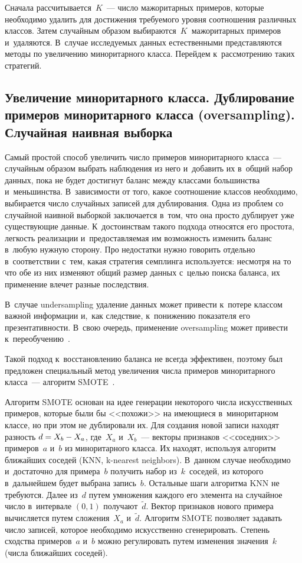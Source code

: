 \begin{multicols}{2}
  Сначала рассчитывается~$K$~--- число мажоритарных примеров, которые 
необходимо удалить для достижения требуемого уровня соотношения 
различных классов. Затем случайным образом 
выбираются~$K$~мажоритарных примеров и~удаляются. В~случае 
исследуемых данных естественными представляются методы по увеличению 
миноритарного класса. Перейдем к~рассмотрению таких стратегий.

  
  \subsection{Увеличение миноритарного класса. Дублирование примеров 
миноритарного класса (oversampling). Случайная наивная выборка}
  
  Самый простой способ увеличить число примеров миноритарного класса~--- 
случайным образом выбрать наблюдения из него и~добавить их в~общий набор 
данных, пока не будет достигнут баланс между классами большинства 
и~меньшинства. В~зависимости от того, какое соотношение классов 
необходимо, выбирается число случайных записей для дублирования. Одна из 
проблем со случайной наивной выборкой заключается в~том, что она просто 
дублирует уже существующие данные. К~достоинствам такого подхода 
относятся его простота, легкость реализации и~предоставляемая им 
возможность изменить баланс в~любую нужную сторону. Про недостатки 
нужно говорить отдельно в~соответствии с~тем, какая стратегия семплинга 
используется: несмотря на то что обе из них изменяют общий размер данных 
с~целью поиска баланса, их применение влечет разные последствия. 

В~случае 
undersampling удаление данных может привести к~потере классом важной 
информации и,~как следствие, к~понижению показателя его презентативности. 
В~свою очередь, применение oversampling может привести 
к~переобучению~\cite{3-sev}. 

Такой подход к~восстановлению баланса не 
всегда эффективен, поэтому был предложен специальный метод увеличения 
числа примеров миноритарного класса~--- алгоритм SMOTE~\cite{5-sev}.
  
  Алгоритм SMOTE основан на идее генерации некоторого числа 
искусственных примеров, которые были бы <<похожи>> на имеющиеся 
в~миноритарном классе, но при этом не дублировали их. Для создания новой 
записи находят разность  $d\hm= X_b\hm-X_a$, где~$X_a$ и~$X_b$~--- векторы 
признаков <<соседних>> примеров~$a$ и~$b$ из миноритарного класса. Их 
находят, используя алгоритм ближайших соседей (KNN, k-nearest neighbors). В~данном случае 
необходимо и~достаточно для примера~$b$ получить набор из~$k$~соседей, из 
которого в~дальнейшем будет выбрана запись~$b$. Остальные шаги алгоритма 
KNN не требуются. Далее из~$d$ путем умножения каждого его элемента на 
случайное число в~интервале $(0, 1)$ получают~$\tilde{d}$. Вектор признаков 
нового примера вычисляется путем сложения~$X_a$ и~$\tilde{d}$. Алгоритм 
SMOTE позволяет задавать число записей, которое необходимо искусственно 
сгенерировать. Степень сходства примеров~$a$ и~$b$ можно регулировать 
путем изменения значения~$k$ (числа ближайших соседей). 
  

\end{multicols}

